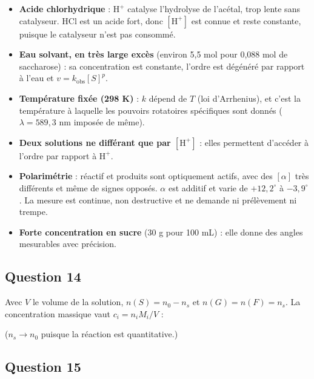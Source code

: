 \documentclass[11pt,a4paper]{article}
\providecommand{\tightlist}{\setlength{\itemsep}{0pt}\setlength{\parskip}{0pt}}
\newcommand{\equationajustee}[1]{%
  \sbox{\boiteequation}{$\displaystyle #1$}%
  \ifdim\wd\boiteequation>\linewidth
    \[\resizebox{\linewidth}{!}{\usebox{\boiteequation}}\]%
  \else
    \[#1\]%
  \fi}
\begin{document}
\begin{itemize}
\tightlist
\item
  \textbf{Acide chlorhydrique} : \(\mathrm{H^+}\) catalyse l'hydrolyse de l'acétal, trop lente sans catalyseur. HCl est un acide fort, donc \([\mathrm{H^+}]\) est connue et reste constante, puisque le catalyseur n'est pas consommé.
\item
  \textbf{Eau solvant, en très large excès} (environ 5,5 mol pour 0,088 mol de saccharose) : sa concentration est constante, l'ordre est dégénéré par rapport à l'eau et \(v=k_{\text{obs}}[S]^p\).
\item
  \textbf{Température fixée (298 K)} : \(k\) dépend de \(T\) (loi d'Arrhenius), et c'est la température à laquelle les pouvoirs rotatoires spécifiques sont donnés (\(\lambda=589{,}3\) nm imposée de même).
\item
  \textbf{Deux solutions ne différant que par \([\mathrm{H^+}]\)} : elles permettent d'accéder à l'ordre par rapport à \(\mathrm{H^+}\).
\item
  \textbf{Polarimétrie} : réactif et produits sont optiquement actifs, avec des \([\alpha]\) très différents et même de signes opposés. \(\alpha\) est additif et varie de \(+12{,}2^\circ\) à \(-3{,}9^\circ\). La mesure est continue, non destructive et ne demande ni prélèvement ni trempe.
\item
  \textbf{Forte concentration en sucre} (30 g pour 100 mL) : elle donne des angles mesurables avec précision.
\end{itemize}

\hypertarget{question-14}{%
\subsection{Question 14}\label{question-14}}

Avec \(V\) le volume de la solution, \(n(S)=n_0-n_s\) et \(n(G)=n(F)=n_s\). La concentration massique vaut \(c_i=n_iM_i/V\) :

\equationajustee{\boxed{\alpha(t)=\frac{\ell}{V}\Big[[\alpha]_S(n_0-n_s)M_S+[\alpha]_G\,n_s\,M_G+[\alpha]_F\,n_s\,M_F\Big]}}

\equationajustee{\boxed{\alpha(0)=\frac{\ell}{V}[\alpha]_S\,n_0\,M_S}}

\equationajustee{\boxed{\alpha(\infty)=\frac{\ell}{V}\,n_0\big([\alpha]_GM_G+[\alpha]_FM_F\big)}}

(\(n_s\to n_0\) puisque la réaction est quantitative.)

\hypertarget{question-15}{%
\subsection{Question 15}\label{question-15}}
\end{document}
